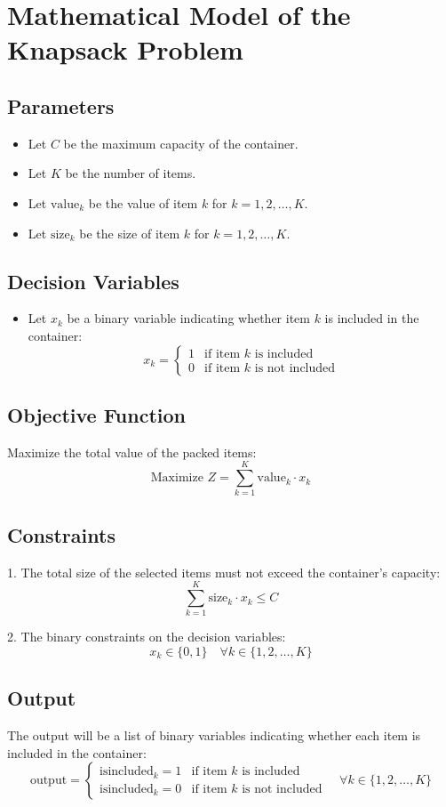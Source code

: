 \documentclass{article}
\begin{document}
\section*{Mathematical Model of the Knapsack Problem}

\subsection*{Parameters}
\begin{itemize}
    \item Let \( C \) be the maximum capacity of the container.
    \item Let \( K \) be the number of items.
    \item Let \( \text{value}_k \) be the value of item \( k \) for \( k = 1, 2, \ldots, K \).
    \item Let \( \text{size}_k \) be the size of item \( k \) for \( k = 1, 2, \ldots, K \).
\end{itemize}

\subsection*{Decision Variables}
\begin{itemize}
    \item Let \( x_k \) be a binary variable indicating whether item \( k \) is included in the container:
    \[
    x_k =
    \begin{cases}
    1 & \text{if item } k \text{ is included} \\
    0 & \text{if item } k \text{ is not included}
    \end{cases}
    \]
\end{itemize}

\subsection*{Objective Function}
Maximize the total value of the packed items:
\[
\text{Maximize } Z = \sum_{k=1}^{K} \text{value}_k \cdot x_k
\]

\subsection*{Constraints}
1. The total size of the selected items must not exceed the container's capacity:
\[
\sum_{k=1}^{K} \text{size}_k \cdot x_k \leq C
\]

2. The binary constraints on the decision variables:
\[
x_k \in \{0, 1\} \quad \forall k \in \{1, 2, \ldots, K\}
\]

\subsection*{Output}
The output will be a list of binary variables indicating whether each item is included in the container:
\[
\text{output} =
\begin{cases}
\text{isincluded}_k = 1 & \text{if item } k \text{ is included} \\
\text{isincluded}_k = 0 & \text{if item } k \text{ is not included}
\end{cases} \quad \forall k \in \{1, 2, \ldots, K\}
\]
\end{document}
